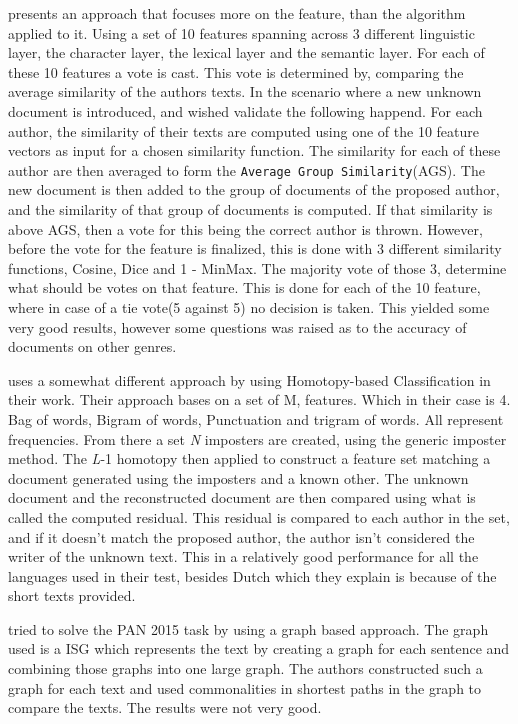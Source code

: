 \cite{castro2015Paper} presents an approach that focuses more on the feature, than 
the algorithm applied to it. Using a set of 10 features spanning across 3 
different linguistic layer, the character layer, the lexical layer and the 
semantic layer. For each of these 10 features a vote is cast.
This vote is determined by, comparing the average similarity of the authors 
texts. In the scenario where a new unknown document is introduced, and wished 
validate the following happend.
For each author, the similarity of their texts are computed using one of the 10 
feature vectors as input for a chosen similarity function. The similarity for 
each of these author are then averaged to form the \texttt{Average Group 
Similarity}(AGS). The new document is then added to the group of documents of 
the proposed author, and the similarity of that group of documents is computed. 
If that similarity is above AGS, then a vote for this being the correct author 
is thrown.
However, before the vote for the feature is finalized, this is done with 3 
different similarity functions, Cosine, Dice and 1 - MinMax. The majority vote 
of those 3, determine what should be votes on that feature. This is done for 
each of the 10 feature, where in case of a tie vote(5 against 5) no decision is 
taken. This yielded some very good results, however some questions was raised 
as to the accuracy of documents on other genres.


\cite{gutierrez20150} uses a somewhat different approach by using Homotopy-based 
Classification in their work. Their approach bases on a set of M, features. 
Which in their case is 4. Bag of words, Bigram of words, Punctuation and 
trigram of words. All represent frequencies. From there a set \textit{N} 
imposters are created, using the generic imposter method. The \textit{L}-1 
homotopy then applied to construct a feature set matching a document generated 
using the imposters and a known other. The unknown document and the 
reconstructed document are then compared using what is called the computed 
residual. This residual is compared to each author in the set, and if it 
doesn't match the proposed author,  the author isn't considered the writer of 
the unknown text. This in a relatively good performance for all the languages 
used in their test, besides Dutch which they explain is because of the short 
texts provided. 

\cite{gomezadorno2015} tried to solve the PAN 2015 task by using a graph based
approach. The graph used is a \gls{ISG} which represents the text by creating a
graph for each sentence and combining those graphs into one large graph. The
authors constructed such a graph for each text and used commonalities in
shortest paths in the graph to compare the texts. The results were not very
good.


